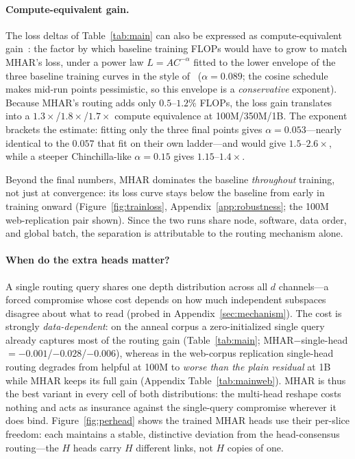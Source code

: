 \documentclass{article}
\begin{document}
\paragraph{Compute-equivalent gain.} The loss deltas of
Table~\ref{tab:main} can also be expressed as compute-equivalent
gain~\citep{davidson2023ceg,mai2026thinking}: the factor by which baseline
training FLOPs would have to grow to match MHAR's loss, under a power law
$L{=}AC^{-\alpha}$ fitted to the lower envelope of the three baseline
training curves in the style of~\citet{kaplan2020scaling}
($\alpha{=}0.089$; the cosine schedule makes mid-run points pessimistic, so
this envelope is a \emph{conservative} exponent). Because MHAR's routing adds
only $0.5$--$1.2\%$ FLOPs, the loss gain translates into a
$1.3\times$/$1.8\times$/$1.7\times$ compute equivalence at 100M/350M/1B. The exponent brackets the estimate:
fitting only the three final points gives $\alpha{=}0.053$---nearly identical
to the $0.057$ that \citet{kimi2025attention} fit on their own ladder---and
would give $1.5$--$2.6\times$, while a steeper Chinchilla-like
$\alpha{=}0.15$ gives $1.15$--$1.4\times$.

Beyond the final numbers, MHAR dominates the baseline \emph{throughout}
training, not just at convergence: its loss curve stays below the baseline from
early in training onward (Figure~\ref{fig:trainloss}, Appendix~\ref{app:robustness};
the 100M web-replication pair shown). Since the two runs share
node, software, data order, and global batch, the separation is attributable to
the routing mechanism alone.

\paragraph{When do the extra heads matter?} A single routing query shares
one depth distribution across all $d$ channels---a forced compromise whose cost
depends on how much independent subspaces disagree about what to read
(probed in Appendix~\ref{sec:mechanism}). The cost is strongly
\emph{data-dependent}: on the anneal corpus a zero-initialized single query
already captures most of the routing gain (Table~\ref{tab:main};
MHAR$-$single-head $= -0.001$/$-0.028$/$-0.006$), whereas in the
web-corpus replication single-head routing degrades from helpful at 100M to
\emph{worse than the plain residual} at 1B while MHAR keeps its full gain
(Appendix Table~\ref{tab:mainweb}). MHAR is thus the best variant in every
cell of both distributions: the multi-head reshape costs nothing and acts as
insurance against the single-query compromise wherever it does bind.
Figure~\ref{fig:perhead} shows the
trained MHAR heads use their per-slice freedom: each maintains a stable,
distinctive deviation from the head-consensus routing---the $H$ heads carry
$H$ different links, not $H$ copies of one.
\end{document}
